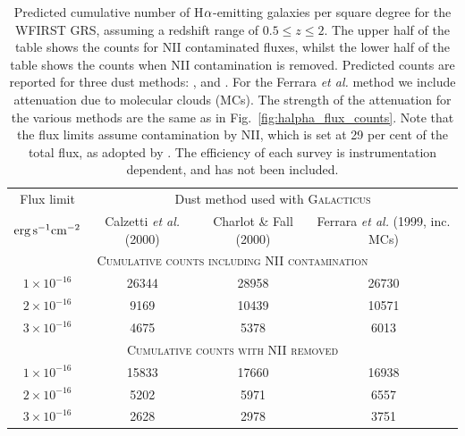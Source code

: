 \begin{table}
\centering
\caption{Predicted cumulative number of H${\rm \alpha}$-emitting
  galaxies per square degree for the WFIRST GRS, assuming a redshift
  range of $0.5\leqslant z\leqslant 2$. The upper half of the table
  shows the counts for NII contaminated fluxes, whilst the lower half
  of the table shows the counts when NII contamination is
  removed. Predicted counts are reported for three dust methods:
  \citet{Calzetti00}, \citet{Charlot00} and \citet{Ferrara99}. For the Ferrara \textit{et al.} method we include attenuation due to molecular clouds (MCs). The
  strength of the attenuation for the various methods are the same as
  in Fig.~\ref{fig:halpha_flux_counts}. Note that the flux limits
  assume contamination by NII, which is set at 29 per cent of the
  total flux, as adopted by \citet{Colbert13}. The efficiency of each survey is
  instrumentation dependent, and has not been included.}
\begin{tabular}{|c|c|c|c|}
\hline
Flux limit&\multicolumn{3}{|c|}{Dust method used with \textsc{Galacticus}}\\
${\rm erg}\,{\rm s}^{-1}{\rm cm}^{-2}$&Calzetti \textit{et al.} (2000) & Charlot \& Fall (2000) & Ferrara \textit{et al.} (1999, inc. MCs)\\
\hline\hline
\multicolumn{4}{|c|}{\textsc{Cumulative counts including NII contamination}}\\
$1\times 10^{-16}$&26344&28958&26730\\
$2\times 10^{-16}$&9169&10439&10571\\
$3\times 10^{-16}$&4675&5378&6013\\
\hline
\multicolumn{4}{|c|}{\textsc{Cumulative counts with NII removed}}\\
$1\times 10^{-16}$&15833&17660&16938\\
$2\times 10^{-16}$&5202&5971&6557\\
$3\times 10^{-16}$&2628&2978&3751\\
\hline
\end{tabular}
\label{tab:cumulativeFluxCounts}
\end{table}

